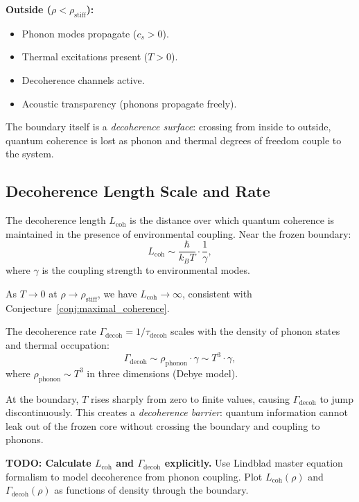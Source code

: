 \documentclass[11pt,a4paper]{article}
\newcommand{\rhostiff}{\ensuremath{\rho_{\mathrm{stiff}}}}
\newcommand{\taudecoh}{\ensuremath{\tau_{\mathrm{decoh}}}}
\newcommand{\Lcoh}{\ensuremath{L_{\mathrm{coh}}}}
\theoremstyle{definition}
\theoremstyle{remark}
\begin{document}
\textbf{Outside ($\rho < \rhostiff$):}
\begin{itemize}[leftmargin=*, itemsep=0.2em]
\item Phonon modes propagate ($c_s > 0$).
\item Thermal excitations present ($T > 0$).
\item Decoherence channels active.
\item Acoustic transparency (phonons propagate freely).
\end{itemize}

The boundary itself is a \emph{decoherence surface}: crossing from inside to outside, quantum coherence is lost as phonon and thermal degrees of freedom couple to the system.

\subsection{Decoherence Length Scale and Rate}
\label{sec:decoherence_scale}

The decoherence length $\Lcoh$ is the distance over which quantum coherence is maintained in the presence of environmental coupling. Near the frozen boundary:
\begin{equation}
\label{eq:coherence_length}
\Lcoh \sim \frac{\hbar}{k_B T} \cdot \frac{1}{\gamma},
\end{equation}
where $\gamma$ is the coupling strength to environmental modes.

As $T \to 0$ at $\rho \to \rhostiff$, we have $\Lcoh \to \infty$, consistent with Conjecture~\ref{conj:maximal_coherence}.

The decoherence rate $\Gamma_{\mathrm{decoh}} = 1/\taudecoh$ scales with the density of phonon states and thermal occupation:
\begin{equation}
\label{eq:decoherence_rate}
\Gamma_{\mathrm{decoh}} \sim \rho_{\mathrm{phonon}} \cdot \gamma \sim T^3 \cdot \gamma,
\end{equation}
where $\rho_{\mathrm{phonon}} \sim T^3$ in three dimensions (Debye model).

At the boundary, $T$ rises sharply from zero to finite values, causing $\Gamma_{\mathrm{decoh}}$ to jump discontinuously. This creates a \emph{decoherence barrier}: quantum information cannot leak out of the frozen core without crossing the boundary and coupling to phonons.

\textbf{TODO: Calculate $\Lcoh$ and $\Gamma_{\mathrm{decoh}}$ explicitly.} Use Lindblad master equation formalism to model decoherence from phonon coupling. Plot $\Lcoh(\rho)$ and $\Gamma_{\mathrm{decoh}}(\rho)$ as functions of density through the boundary.
\end{document}
